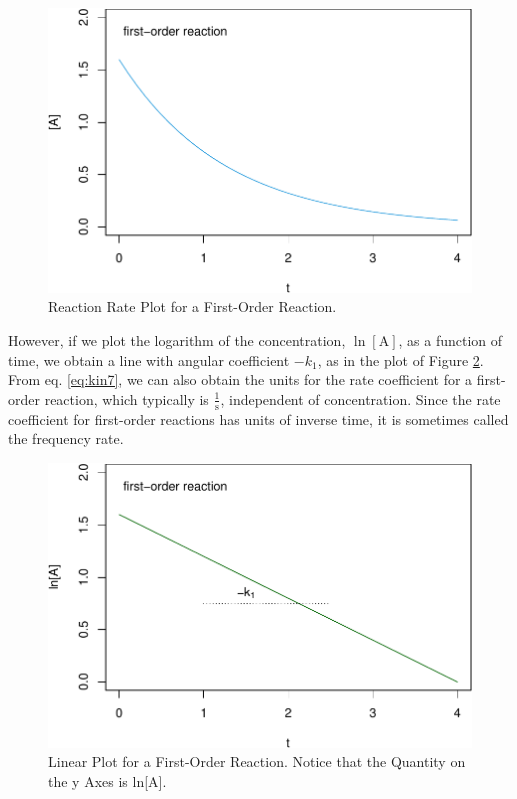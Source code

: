 \documentclass[
  9pt,
]{extbook}
\theoremstyle{definition}
\theoremstyle{definition}
\theoremstyle{definition}
\theoremstyle{remark}
\begin{document}
\begin{figure}

{\centering \includegraphics{pchem1_files/figure-latex/figk2-1} 

}

\caption{Reaction Rate Plot for a First-Order Reaction.}\label{fig:figk2}
\end{figure}

However, if we plot the logarithm of the concentration, \(\ln[\mathrm{A}]\), as a function of time, we obtain a line with angular coefficient \(-k_1\), as in the plot of Figure \ref{fig:figk3}. From eq. \eqref{eq:kin7}, we can also obtain the units for the rate coefficient for a first-order reaction, which typically is \(\frac{1}{\mathrm{s}}\), independent of concentration. Since the rate coefficient for first-order reactions has units of inverse time, it is sometimes called the frequency rate.

\begin{figure}

{\centering \includegraphics{pchem1_files/figure-latex/figk3-1} 

}

\caption{Linear Plot for a First-Order Reaction. Notice that the Quantity on the y Axes is ln[A].}\label{fig:figk3}
\end{figure}
\end{document}
